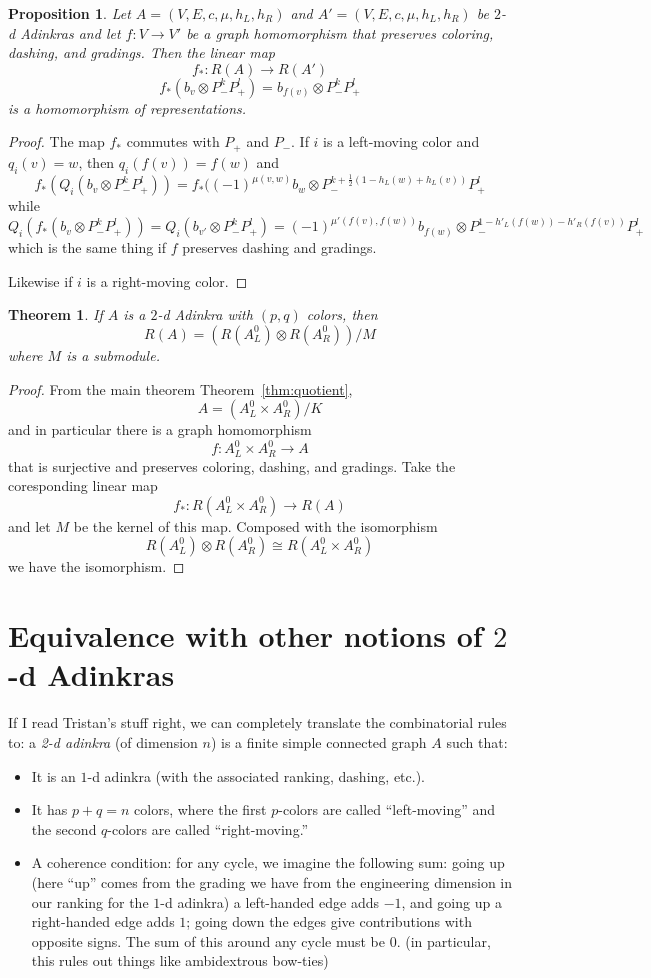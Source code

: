 \documentclass[12pt,twoside,singlespace]{article}
\numberwithin{equation}{section}
\newtheorem{thm}[equation]{Theorem}
\newtheorem{prop}[equation]{Proposition}
\theoremstyle{definition}
\begin{document}
\begin{prop}
Let $A=(V,E,c,\mu,h_L,h_R)$ and $A'=(V,E,c,\mu,h_L,h_R)$ be $2$-d Adinkras and let $f:V\to V'$ be a graph homomorphism that preserves coloring, dashing, and gradings.  Then the linear map
\[f_*:R(A)\to R(A')\]
\[f_*(b_v\otimes P_-^kP_+^l)=b_{f(v)}\otimes P_-^kP_+^l\]
is a homomorphism of representations.
\end{prop}
\begin{proof}
The map $f_*$ commutes with $P_+$ and $P_-$.  If $i$ is a left-moving color and $q_i(v)=w$, then $q_i(f(v))=f(w)$ and
\[f_*(Q_i(b_v\otimes P_-^kP_+^l))=f_*((-1)^{\mu(v,w)}b_w\otimes P_-^{k+\frac12(1-h_L(w)+h_L(v))}P_+^l\]
while
\[Q_i(f_*(b_v\otimes P_-^kP_+^l))=Q_i(b_{v'}\otimes P_-^kP_+^l)
=(-1)^{\mu'(f(v),f(w))}b_{f(w)}\otimes P_-^{1-h'_L(f(w))-h'_R(f(v))}P_+^l\]
which is the same thing if $f$ preserves dashing and gradings.

Likewise if $i$ is a right-moving color.
\end{proof}

\begin{thm}
If $A$ is a $2$-d Adinkra with $(p,q)$ colors, then 
\[R(A)=(R(A_L^0)\otimes R(A_R^0))/M\]
where $M$ is a submodule.
\end{thm}
\begin{proof}
From the main theorem Theorem~\ref{thm:quotient},
\[A=(A_L^0\times A_R^0)/K\]
and in particular there is a graph homomorphism
\[f:A_L^0\times A_R^0\to A\]
that is surjective and preserves coloring, dashing, and gradings.  Take the coresponding linear map
\[f_*:R(A_L^0\times A_R^0)\to R(A)\]
and let $M$ be the kernel of this map.  Composed with the isomorphism
\[R(A_L^0)\otimes R(A_R^0)\cong R(A_L^0\times A_R^0)\]
we have the isomorphism.
\end{proof}


\section{Equivalence with other notions of $2$-d Adinkras}


If I read Tristan's stuff right, we can completely translate the combinatorial rules to: a \emph{2-d adinkra} (of dimension $n$) is a finite simple connected graph $A$ such that:
\begin{itemize}
\item It is an $1$-d adinkra (with the associated ranking, dashing, etc.).
\item It has $p + q = n$ colors, where the first $p$-colors are called ``left-moving'' and the second $q$-colors are called ``right-moving.''
\item A coherence condition: for any cycle, we imagine the following sum: going up (here ``up'' comes from the grading we have from the engineering dimension in our ranking for the $1$-d adinkra) a left-handed edge adds $-1$, and going up a right-handed edge adds $1$; going down the edges give contributions with opposite signs. The sum of this around any cycle must be $0$. (in particular, this rules out things like ambidextrous bow-ties)
\end{itemize} 
\end{document}
